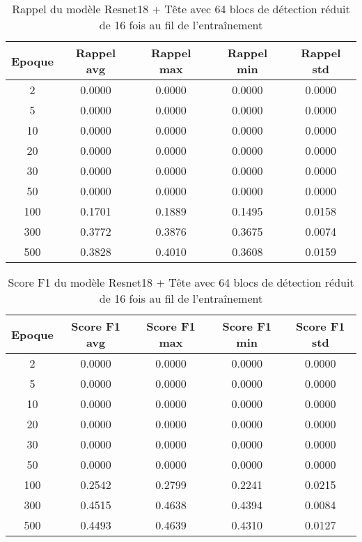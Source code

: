 \begin{table}[!ht]
    \caption{Rappel du modèle Resnet18 + Tête avec 64 blocs de détection réduit de 16 fois au fil de l'entraînement}
    \label{tab:resnet18+head_64n_reduced_16x_rappel}
    \centering
    \begin{tabular}{ |c||c|c|c|c|  }
        \hline
        \rowcolor{gray!50}
        Epoque & Rappel avg & Rappel max & Rappel min & Rappel std\\
        \hline
        2 & 0.0000 & 0.0000 & 0.0000 & 0.0000\\
        5 & 0.0000 & 0.0000 & 0.0000 & 0.0000\\
        10 & 0.0000 & 0.0000 & 0.0000 & 0.0000\\
        20 & 0.0000 & 0.0000 & 0.0000 & 0.0000\\
        30 & 0.0000 & 0.0000 & 0.0000 & 0.0000\\
        50 & 0.0000 & 0.0000 & 0.0000 & 0.0000\\
        100 & 0.1701 & 0.1889 & 0.1495 & 0.0158\\
        300 & 0.3772 & 0.3876 & 0.3675 & 0.0074\\
        500 & 0.3828 & 0.4010 & 0.3608 & 0.0159\\
        \hline
    \end{tabular}
\end{table}

\begin{table}[!ht]
    \caption{Score F1 du modèle Resnet18 + Tête avec 64 blocs de détection réduit de 16 fois au fil de l'entraînement}
    \label{tab:resnet18+head_64n_reduced_16x_f1score}
    \centering
    \begin{tabular}{ |c||c|c|c|c|  }
        \hline
        \rowcolor{gray!50}
        Epoque & Score F1 avg & Score F1 max & Score F1 min & Score F1 std\\
        \hline
        2 & 0.0000 & 0.0000 & 0.0000 & 0.0000\\
        5 & 0.0000 & 0.0000 & 0.0000 & 0.0000\\
        10 & 0.0000 & 0.0000 & 0.0000 & 0.0000\\
        20 & 0.0000 & 0.0000 & 0.0000 & 0.0000\\
        30 & 0.0000 & 0.0000 & 0.0000 & 0.0000\\
        50 & 0.0000 & 0.0000 & 0.0000 & 0.0000\\
        100 & 0.2542 & 0.2799 & 0.2241 & 0.0215\\
        300 & 0.4515 & 0.4638 & 0.4394 & 0.0084\\
        500 & 0.4493 & 0.4639 & 0.4310 & 0.0127\\
        \hline
    \end{tabular}
\end{table}

